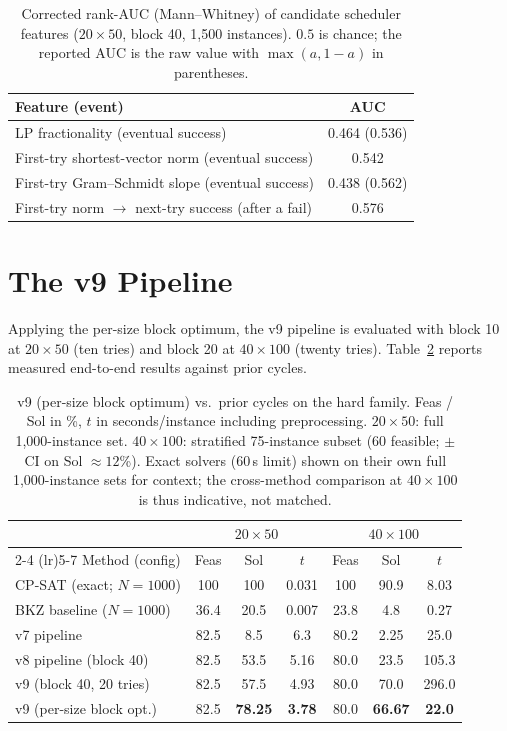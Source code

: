 \documentclass[12pt]{article}
\begin{document}
\begin{table}[t]
\centering
\caption{Corrected rank-AUC (Mann--Whitney) of candidate scheduler features ($20\times50$, block 40, 1{,}500 instances). $0.5$ is chance; the reported AUC is the raw value with $\max(a,1-a)$ in parentheses.}
\label{tab:auc}
\begin{tabular}{lc}
\toprule
Feature (event) & AUC \\
\midrule
LP fractionality (eventual success) & 0.464 (0.536) \\
First-try shortest-vector norm (eventual success) & 0.542 \\
First-try Gram--Schmidt slope (eventual success) & 0.438 (0.562) \\
First-try norm $\rightarrow$ next-try success (after a fail) & 0.576 \\
\bottomrule
\end{tabular}
\end{table}

\section{The v9 Pipeline}

Applying the per-size block optimum, the v9 pipeline is evaluated with block 10 at $20 \times 50$ (ten tries) and block 20 at $40 \times 100$ (twenty tries). Table~\ref{tab:v9} reports measured end-to-end results against prior cycles.

\begin{table}[t]
\centering
\caption{v9 (per-size block optimum) vs.\ prior cycles on the hard family. Feas / Sol in \%, $t$ in seconds/instance including preprocessing. $20 \times 50$: full 1{,}000-instance set. $40 \times 100$: stratified 75-instance subset (60 feasible; $\pm$CI on Sol $\approx 12$\%). Exact solvers (60\,s limit) shown on their own full 1{,}000-instance sets for context; the cross-method comparison at $40\times100$ is thus indicative, not matched.}
\label{tab:v9}
\begin{tabular}{l ccc ccc}
\toprule
& \multicolumn{3}{c}{$20 \times 50$} & \multicolumn{3}{c}{$40 \times 100$} \\
\cmidrule(lr){2-4} \cmidrule(lr){5-7}
Method (config) & Feas & Sol & $t$ & Feas & Sol & $t$ \\
\midrule
CP-SAT (exact; $N{=}1000$) & 100 & 100 & 0.031 & 100 & 90.9 & 8.03 \\
BKZ baseline ($N{=}1000$) & 36.4 & 20.5 & 0.007 & 23.8 & 4.8 & 0.27 \\
v7 pipeline & 82.5 & 8.5 & 6.3 & 80.2 & 2.25 & 25.0 \\
v8 pipeline (block 40) & 82.5 & 53.5 & 5.16 & 80.0 & 23.5 & 105.3 \\
v9 (block 40, 20 tries) & 82.5 & 57.5 & 4.93 & 80.0 & 70.0 & 296.0 \\
\midrule
v9 (per-size block opt.) & 82.5 & \textbf{78.25} & \textbf{3.78} & 80.0 & \textbf{66.67} & \textbf{22.0} \\
\bottomrule
\end{tabular}
\end{table}
\end{document}
